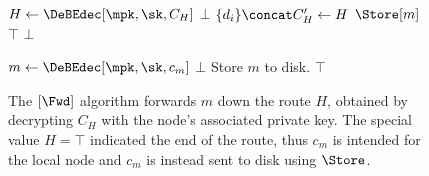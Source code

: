 
\begin{figure}[t]
  \begin{algorithmic}[1]
      \State $H\gets \DeBEdec[\mpk, \sk, C_H]$
        \State \Return $\bot$
      \EndIf
      \State $\{d_i\}\concat C_H'\gets H$
        \State \Return $\Store[m]$
      \EndIf
          \State \Return $\top$
        \EndIf
      \EndFor
      \State \Return $\bot$
    \EndFunction
  \end{algorithmic}

  \begin{algorithmic}[1]
      \State $m\gets \DeBEdec[\mpk, \sk, c_m]$
        \State \Return $\bot$
      \EndIf
      \State Store $m$ to disk.
      \State \Return $\top$
    \EndFunction
  \end{algorithmic}
  \caption{\label{SPORFwd}%
    The \([\Fwd]\) algorithm forwards \(m\) down the route \(H\), obtained 
    by decrypting \(C_H\) with the node's associated private key.
    The special value \(H = \top\) indicated the end of the route, thus \(c_m\) 
    is intended for the local node and \(c_m\) is instead sent to disk using 
    \(\Store\).%
  }
\end{figure}



